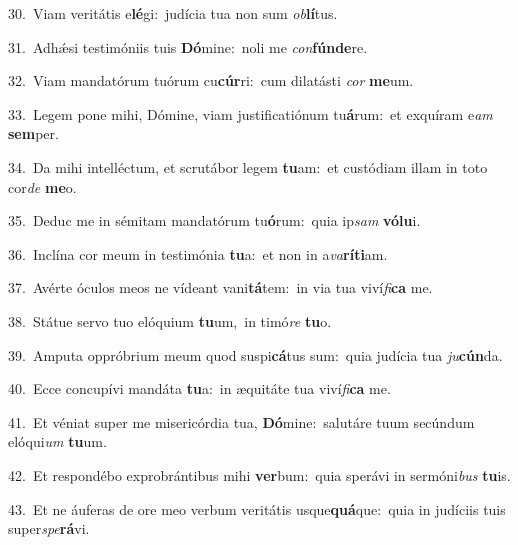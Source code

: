 {\numbfont\textcolor{\numbcolor}{30.}}~Viam veritátis e\-\textbf{lé}\-gi:~\star judícia tua non sum \textit{ob}\-\textbf{lí}tus.\par
{\numbfont\textcolor{\numbcolor}{31.}}~Adhǽsi testimóniis tuis \textbf{Dó}\-mine:~\star noli me \textit{con}\-\textbf{fún}\textbf{de}re.\par
{\numbfont\textcolor{\numbcolor}{32.}}~Viam mandatórum tuórum cu\-\textbf{cúr}\-ri:~\star cum dilatásti \textit{cor} \textbf{me}\-um.\par
{\numbfont\textcolor{\numbcolor}{33.}}~Legem pone mihi, Dómine, viam justificatiónum tu\-\textbf{á}\-rum:~\star et exquíram e\textit{am} \textbf{sem}\-per.\par
{\numbfont\textcolor{\numbcolor}{34.}}~Da mihi intelléctum, et scrutábor legem \textbf{tu}\-am:~\star et custódiam illam in toto cor\textit{de} \textbf{me}\-o.\par
{\numbfont\textcolor{\numbcolor}{35.}}~Deduc me in sémitam mandatórum tu\-\textbf{ó}\-rum:~\star quia ip\textit{sam} \textbf{vó}\-\textbf{lu}i.\par
{\numbfont\textcolor{\numbcolor}{36.}}~Inclína cor meum in testimónia \textbf{tu}\-a:~\star et non in a\-\textit{va}\-\textbf{rí}\textbf{ti}am.\par
{\numbfont\textcolor{\numbcolor}{37.}}~Avérte óculos meos ne vídeant vani\-\textbf{tá}\-tem:~\star in via tua viví\-\textit{fi}\-\textbf{ca} me.\par
{\numbfont\textcolor{\numbcolor}{38.}}~Státue servo tuo elóquium \textbf{tu}\-um,~\star in timó\textit{re} \textbf{tu}\-o.\par
{\numbfont\textcolor{\numbcolor}{39.}}~Amputa oppróbrium meum quod suspi\-\textbf{cá}\-tus sum:~\star quia judícia tua \textit{ju}\-\textbf{cún}da.\par
{\numbfont\textcolor{\numbcolor}{40.}}~Ecce concupívi mandáta \textbf{tu}\-a:~\star in æquitáte tua viví\-\textit{fi}\-\textbf{ca} me.\par
{\numbfont\textcolor{\numbcolor}{41.}}~Et véniat super me misericórdia tua, \textbf{Dó}\-mine:~\star salutáre tuum secúndum elóqui\textit{um} \textbf{tu}\-um.\par
{\numbfont\textcolor{\numbcolor}{42.}}~Et respondébo exprobrántibus mihi \textbf{ver}\-bum:~\star quia sperávi in sermóni\textit{bus} \textbf{tu}\-is.\par
{\numbfont\textcolor{\numbcolor}{43.}}~Et ne áuferas de ore meo verbum veritátis usque\-\textbf{quá}\-que:~\star quia in judíciis tuis super\-\textit{spe}\-\textbf{rá}vi.\par
